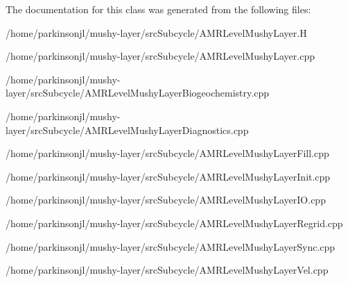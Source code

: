 The documentation for this class was generated from the following files\+:\begin{DoxyCompactItemize}
\item 
/home/parkinsonjl/mushy-\/layer/src\+Subcycle/A\+M\+R\+Level\+Mushy\+Layer.\+H\item 
/home/parkinsonjl/mushy-\/layer/src\+Subcycle/A\+M\+R\+Level\+Mushy\+Layer.\+cpp\item 
/home/parkinsonjl/mushy-\/layer/src\+Subcycle/A\+M\+R\+Level\+Mushy\+Layer\+Biogeochemistry.\+cpp\item 
/home/parkinsonjl/mushy-\/layer/src\+Subcycle/A\+M\+R\+Level\+Mushy\+Layer\+Diagnostics.\+cpp\item 
/home/parkinsonjl/mushy-\/layer/src\+Subcycle/A\+M\+R\+Level\+Mushy\+Layer\+Fill.\+cpp\item 
/home/parkinsonjl/mushy-\/layer/src\+Subcycle/A\+M\+R\+Level\+Mushy\+Layer\+Init.\+cpp\item 
/home/parkinsonjl/mushy-\/layer/src\+Subcycle/A\+M\+R\+Level\+Mushy\+Layer\+I\+O.\+cpp\item 
/home/parkinsonjl/mushy-\/layer/src\+Subcycle/A\+M\+R\+Level\+Mushy\+Layer\+Regrid.\+cpp\item 
/home/parkinsonjl/mushy-\/layer/src\+Subcycle/A\+M\+R\+Level\+Mushy\+Layer\+Sync.\+cpp\item 
/home/parkinsonjl/mushy-\/layer/src\+Subcycle/A\+M\+R\+Level\+Mushy\+Layer\+Vel.\+cpp\end{DoxyCompactItemize}
